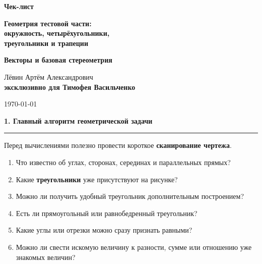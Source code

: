 \documentclass[a4paper,12pt]{article}
\newcommand{\topic}[1]{%
  \vspace{0.8em}
  {\Large\bfseries\textcolor{darkaccent}{#1}}\par
  \vspace{0.25em}
  {\color{accent}\rule{\linewidth}{0.6pt}}
  \vspace{0.45em}
}
\newcommand{\key}[1]{\textcolor{darkaccent}{\textbf{#1}}}
\begin{document}
\begin{titlepage}
\thispagestyle{empty}

\begin{center}

\vspace*{0.19\textheight}

{\Huge\bfseries\textcolor{darkaccent}{Чек-лист}}

\vspace{8mm}

{\LARGE\bfseries
Геометрия тестовой части:\\[2mm]
окружность, четырёхугольники,\\
треугольники и трапеции}

\vspace{5mm}

{\Large\bfseries
Векторы и базовая стереометрия}

\vspace{18mm}

{\large
Лёвин Артём Александрович\\[2mm]
\textbf{эксклюзивно для Тимофея Васильченко}
}

\vfill

{\large \today}

\end{center}


\end{titlepage}


\topic{1. Главный алгоритм геометрической задачи}

Перед вычислениями полезно провести короткое \key{сканирование чертежа}.

\begin{enumerate}
  \item Что известно об углах, сторонах, серединах и параллельных прямых?
  \item Какие \key{треугольники} уже присутствуют на рисунке?
  \item Можно ли получить удобный треугольник дополнительным построением?
  \item Есть ли прямоугольный или равнобедренный треугольник?
  \item Какие углы или отрезки можно сразу признать равными?
  \item Можно ли свести искомую величину к разности, сумме или отношению уже знакомых величин?
\end{enumerate}
\end{document}
